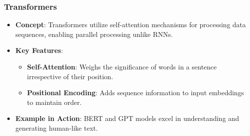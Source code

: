 \documentclass[aspectratio=169]{beamer}
\begin{document}
\begin{frame}[fragile]
    \frametitle{Transformers}
    \begin{itemize}
        \item \textbf{Concept}: Transformers utilize self-attention mechanisms for processing data sequences, enabling parallel processing unlike RNNs.
        \item \textbf{Key Features}:
        \begin{itemize}
            \item \textbf{Self-Attention}: Weighs the significance of words in a sentence irrespective of their position.
            \item \textbf{Positional Encoding}: Adds sequence information to input embeddings to maintain order.
        \end{itemize}
        \item \textbf{Example in Action}: BERT and GPT models excel in understanding and generating human-like text.
    \end{itemize}
\end{frame}
\end{document}

